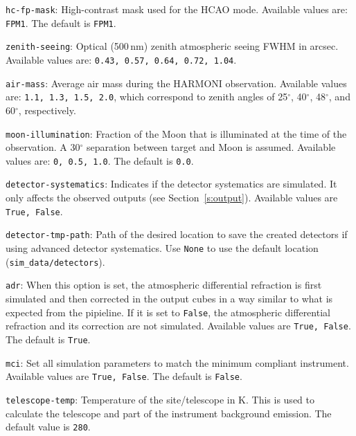 \documentclass[12pt]{report}
\begin{document}
\begin{description}
\item \texttt{hc-fp-mask}: High-contrast mask used for the HCAO mode. Available values are: \texttt{FPM1}. The default is \texttt{FPM1}.

\item \texttt{zenith-seeing}: Optical (500\,nm) zenith atmospheric seeing FWHM in arcsec. Available values are: \texttt{0.43, 0.57, 0.64, 0.72, 1.04}.

\item \texttt{air-mass}: Average air mass during the HARMONI observation. Available values are: \texttt{1.1, 1.3, 1.5, 2.0}, which correspond to zenith angles of 25$^{\circ}$, 40$^{\circ}$, 48$^{\circ}$, and 60$^{\circ}$, respectively.

\item \texttt{moon-illumination}: Fraction of the Moon that is illuminated at the time of the observation. A 30$^{\circ}$ separation between target and Moon is assumed. Available values are: \texttt{0, 0.5, 1.0}. The default is \texttt{0.0}.

\item \texttt{detector-systematics}: Indicates if the detector systematics are simulated. It only affects the observed outputs (see Section~\ref{s:output}). Available values are \texttt{True, False}.

\item \texttt{detector-tmp-path}: Path of the desired location to save the created detectors if using advanced detector systematics. Use \texttt{None} to use the default location (\texttt{sim\_data/detectors}).

\item \texttt{adr}: When this option is set, the atmospheric differential refraction is first simulated and then corrected in the output cubes in a way similar to what is expected from the pipieline. If it is set to \texttt{False}, the atmospheric differential refraction and its correction are not simulated. Available values are \texttt{True, False}. The default is \texttt{True}.

\item \texttt{mci}: Set all simulation parameters to match the minimum compliant instrument. Available values are \texttt{True, False}. The default is \texttt{False}.

\item \texttt{telescope-temp}: Temperature of the site\slash telescope in K. This is used to calculate the telescope and part of the instrument background emission. The default value is \texttt{280}.


\end{description}
\end{document}
